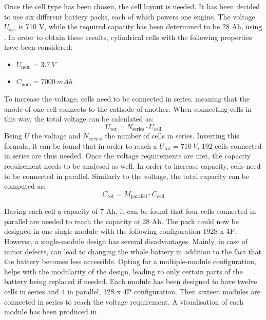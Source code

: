 Once the cell type has been chosen, the cell layout is needed.
It has been decided to use six different battery packs, each of which powers one engine.
The voltage $U_\text{sys}$ is 710 V,
while the required capacity has been determined to be 28 Ah, using .
In order to obtain these results, cylindrical cells with the following properties have been considered:
\begin{itemize}
    \item $U_\text{nom} = \qty{3.7}{V}$
    \item $C_\text{nom} = \qty{7000}{mAh}$
\end{itemize}
To increase the voltage, cells need to be connected in series,
meaning that the anode of one cell connects to the cathode of another.
When connecting cells in this way, the total voltage can be calculated as:
\begin{equation}
    U_\text{tot} = N_\text{series} \cdot U_\text{cell}
\end{equation}
Being $U$ the voltage and $N_{series}$ the number of cells in series.
Inverting this formula, it can be found that in order to reach a $U_\text{tot} = \qty{710}{V}$,
192 cells connected in series are thus needed.
Once the voltage requirements are met, the capacity requirement needs to be analysed as well.
In order to increase capacity, cells need to be connected in parallel.
Similarly to the voltage, the total capacity can be computed as:
\begin{equation}
    C_\text{tot} = M_\text{parallel} \cdot C_\text{cell}
\end{equation}

Having each cell a capacity of 7 Ah, it can be found that four cells connected in parallel are needed to reach the capacity of 28 Ah.
The pack could now be designed in one single module with the following configuration 192S x 4P.
However, a single-module design has several disadvantages.
Mainly,
in case of minor defects, can lead
to changing the whole battery in addition to the fact that the battery becomes less accessible.
Opting for a multiple-module configuration, helps with the modularity of the design,
leading to only certain parts of the battery being replaced if needed.
Each module has been designed to have twelve cells in series and 4 in parallel, 12S x 4P configuration.
Then sixteen modules are connected in series to reach the voltage requirement.
A visualisation of each module has been produced in .

